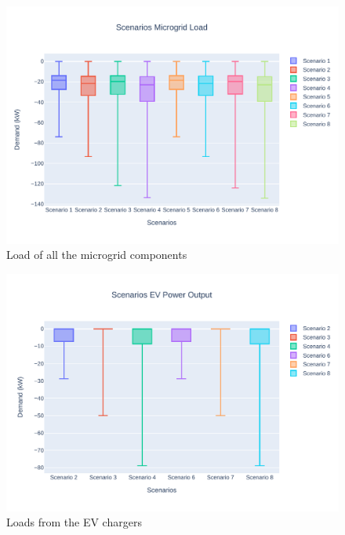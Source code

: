 \documentclass[conference]{IEEEtran}
\begin{document}
	\begin{figure}[H]
		\centering
		\includegraphics[width=0.9\linewidth]{Fig/scenarios_mg_load_output_boxplot}
		\caption{Load of all the microgrid components}
		\label{fig:scenariosmgloadoutputboxplot}
	\end{figure}
	
	\begin{figure}[H]
		\centering
		\includegraphics[width=0.9\linewidth]{Fig/scenarios_ev_power_output_boxplot}
		\caption{Loads from the EV chargers}
		\label{fig:scenariosevpoweroutputboxplot}
	\end{figure}
	
	
	
\end{document}

